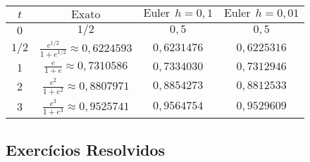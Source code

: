   \begin{tabular}{|c|c|c|c|}\hline
    $t$ & $\text{Exato}$ & $\text{Euler}~~ h=0,1$ & $\text{Euler}~~ h=0,01$\\\hline
    $0$ & $1/2$ & $0,5$ & $0,5$\\\hline
    $1/2$ & $\frac{e^{1/2}}{1+e^{1/2}}\approx 0,6224593$ & $0,6231476$ & $0,6225316$\\\hline
    $1$ & $\frac{e}{1+e}\approx 0,7310586$ & $0,7334030$ & $0,7312946$\\\hline
    $2$ & $\frac{e^2}{1+e^2}\approx  0,8807971$ & $0,8854273$  & $0,8812533$ \\\hline
    $3$ & $\frac{e^3}{1+e^3}\approx   0,9525741$  & $0,9564754$ & $0,9529609$ \\\hline
  \end{tabular}

\subsection*{Exercícios Resolvidos}

